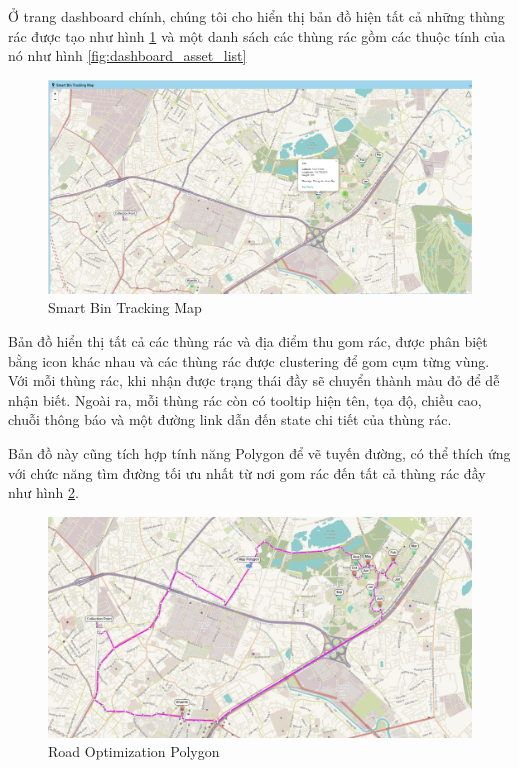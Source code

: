 Ở trang dashboard chính, chúng tôi cho hiển thị bản đồ hiện tất cả những thùng rác được tạo như hình \ref{fig:dashboard_map} và một danh sách các thùng rác gồm các thuộc tính của nó như hình \ref{fig:dashboard_asset_list}

\begin{figure}[H]
    \centering
    \includegraphics[width=\textwidth]{images/Khanh/Thingsboard/Dashboard_map.PNG}
    \caption{Smart Bin Tracking Map}
    \label{fig:dashboard_map}
\end{figure}
Bản đồ hiển thị tất cả các thùng rác và địa điểm thu gom rác, được phân biệt bằng icon khác nhau và các thùng rác được clustering để gom cụm từng vùng. Với mỗi thùng rác, khi nhận được trạng thái đầy sẽ chuyển thành màu đỏ để dễ nhận biết. Ngoài ra, mỗi thùng rác còn có tooltip hiện tên, tọa độ, chiều cao, chuỗi thông báo và một đường link dẫn đến state chi tiết của thùng rác. 

Bản đồ này cũng tích hợp tính năng Polygon để vẽ tuyến đường, có thể thích ứng với chức năng tìm đường tối ưu nhất từ nơi gom rác đến tất cả thùng rác đầy như hình \ref{fig:map_optimization}.
\begin{figure}[H]
    \centering
    \includegraphics[width=\textwidth]{images/Khanh/Thingsboard/Road_optimization.PNG}
    \caption{Road Optimization Polygon}
    \label{fig:map_optimization}
\end{figure}


